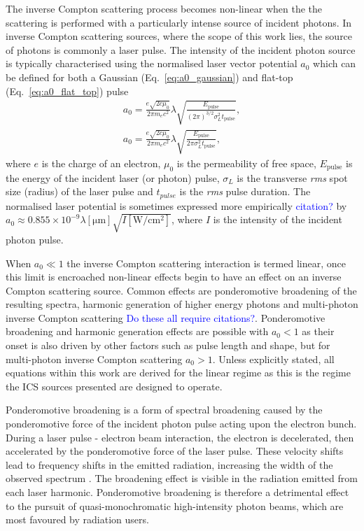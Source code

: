 \documentclass[../main.tex]{subfiles}
\begin{document}
The inverse Compton scattering process becomes non-linear when the the scattering is performed with a particularly intense source of incident photons. In inverse Compton scattering sources, where the scope of this work lies, the source of photons is commonly a laser pulse. The intensity of the incident photon source is typically characterised using the normalised laser vector potential $a_{0}$ which can be defined for both a Gaussian (Eq.~\ref{eq:a0_gaussian}) and flat-top (Eq.~\ref{eq:a0_flat_top}) pulse \cite{terzic2019improving}
\begin{gather}
a_{0} = \frac{e\sqrt{2c\mu_{0}}}{2\pi m_{e}c^{2}}\lambda\sqrt{\frac{E_{\mathrm{pulse}}}{\left(2\pi\right)^{3/2}\sigma_{L}^{2}t_{\mathrm{pulse}}}},
\label{eq:a0_gaussian} \\
a_{0} = \frac{e\sqrt{2c\mu_{0}}}{2\pi m_{e}c^{2}}\lambda\sqrt{\frac{E_{\mathrm{pulse}}}{2\pi\sigma_{L}^{2}t_{\mathrm{pulse}}}},
\label{eq:a0_flat_top}
\end{gather}
where $e$ is the charge of an electron, $\mu_{0}$ is the permeability of free space, $E_{\mathrm{pulse}}$ is the energy of the incident laser (or photon) pulse, $\sigma_{L}$ is the transverse \textit{rms} spot size (radius) of the laser pulse and $t_{pulse}$ is the \textit{rms} pulse duration. The normalised laser potential is sometimes expressed more empirically \textcolor{blue}{citation?} by $a_{0} \approx 0.855\times 10^{-9} \lambda\left[\mathrm{\mu m}\right]\sqrt{I\left[\mathrm{W/cm^{2}}\right]}$, where $I$ is the intensity of the incident photon pulse.

When $a_{0} \ll 1$ the inverse Compton scattering interaction is termed linear, once this limit is encroached non-linear effects begin to have an effect on an inverse Compton scattering source. Common effects are ponderomotive broadening of the resulting spectra, harmonic generation of higher energy photons and multi-photon inverse Compton scattering \textcolor{blue}{Do these all require citations?}. Ponderomotive broadening and harmonic generation effects are possible with $a_{0}<1$ as their onset is also driven by other factors such as pulse length and shape, but for multi-photon inverse Compton scattering $a_{0}>1$. Unless explicitly stated, all equations within this work are derived for the linear regime as this is the regime the ICS sources presented are designed to operate.

Ponderomotive broadening is a form of spectral broadening caused by the ponderomotive force of the incident photon pulse acting upon the electron bunch. During a laser pulse - electron beam interaction, the electron is decelerated, then accelerated by the ponderomotive force of the laser
pulse. These velocity shifts lead to frequency shifts in the
emitted radiation, increasing the width of the observed
spectrum \cite{krafft2004spectral}. The broadening effect is visible in the radiation emitted from each laser harmonic. Ponderomotive broadening is therefore a detrimental effect to the pursuit of quasi-monochromatic high-intensity photon beams, which are most favoured by radiation users. 
\end{document}
